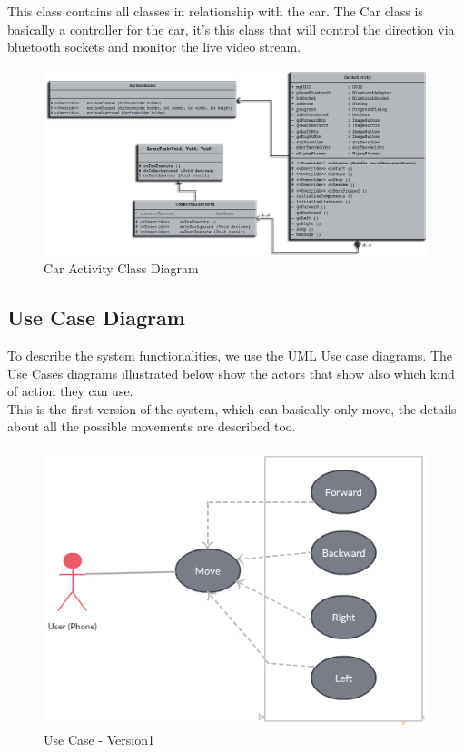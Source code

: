 \documentclass[11pt]{article}
\begin{document}
\pagebreak

\begin{flushleft}
This class contains all classes in relationship with the car. The Car class is basically a controller for the car, it’s this class that will control the direction via bluetooth sockets and monitor the live video stream.
\end{flushleft}
\begin{figure}[h]
\centering
\includegraphics[scale=0.45]{Car_class_diagram2.png}
\caption{Car Activity Class Diagram}
\end{figure}

\pagebreak

\subsection{Use Case Diagram}
\begin{flushleft}
To describe the system functionalities, we use the UML Use case diagrams. The Use Cases diagrams illustrated below show the actors that show also which kind of action they can use.\\
\vspace{0.20cm}
This is the first version of the system, which can basically only move, the details about all the possible movements are described too.
\end{flushleft}
\begin{figure}[h]
\centering
\includegraphics[scale=0.49]{RobotUML_V1.png}
\caption{Use Case - Version1}
\end{figure}
\end{document}

